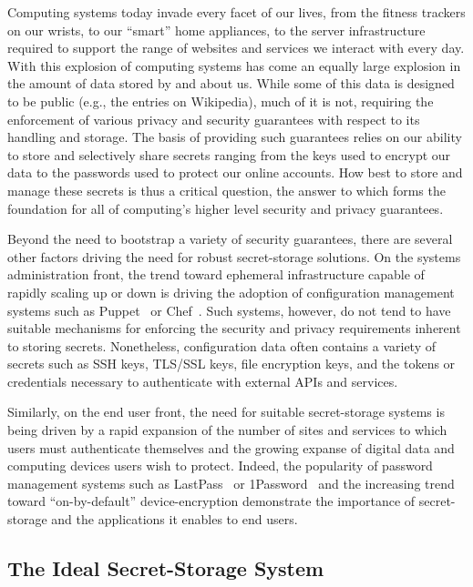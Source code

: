 Computing systems today invade every facet of our lives, from the
fitness trackers on our wrists, to our ``smart'' home appliances, to
the server infrastructure required to support the range of websites
and services we interact with every day. With this explosion of
computing systems has come an equally large explosion in the amount of
data stored by and about us. While some of this data is designed to be
public (e.g., the entries on Wikipedia), much of it is not, requiring
the enforcement of various privacy and security guarantees with
respect to its handling and storage. The basis of providing such
guarantees relies on our ability to store and selectively share
secrets ranging from the keys used to encrypt our data to the
passwords used to protect our online accounts. How best to store and
manage these secrets is thus a critical question, the answer to which
forms the foundation for all of computing's higher level security and
privacy guarantees.

Beyond the need to bootstrap a variety of security guarantees, there
are several other factors driving the need for robust secret-storage
solutions. On the systems administration front, the trend toward
ephemeral infrastructure capable of rapidly scaling up or down is
driving the adoption of configuration management systems such as
Puppet~\cite{puppet} or Chef~\cite{chef}. Such systems, however, do
not tend to have suitable mechanisms for enforcing the security and
privacy requirements inherent to storing secrets. Nonetheless,
configuration data often contains a variety of secrets such as SSH
keys, TLS/SSL keys, file encryption keys, and the tokens or
credentials necessary to authenticate with external APIs and services.

Similarly, on the end user front, the need for suitable secret-storage
systems is being driven by a rapid expansion of the number of sites
and services to which users must authenticate themselves and the
growing expanse of digital data and computing devices users wish to
protect. Indeed, the popularity of password management systems such as
LastPass~\cite{lastpass} or 1Password~\cite{onepassword} and the
increasing trend toward ``on-by-default'' device-encryption
demonstrate the importance of secret-storage and the applications it
enables to end users.

\subsection{The Ideal Secret-Storage System}

